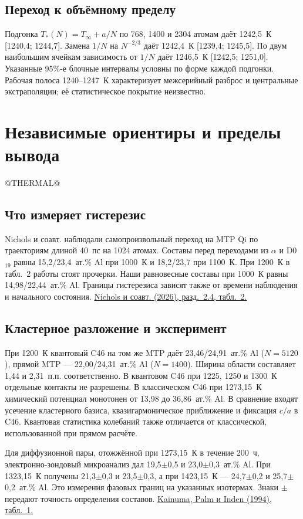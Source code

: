 \documentclass[11pt,a4paper]{article}
\begin{document}
\subsection*{Переход к объёмному пределу}
Подгонка \(T_*(N)=T_\infty+a/N\) по 768, 1400 и 2304 атомам даёт 1242,5~К [1240,4; 1244,7]. Замена \(1/N\) на \(N^{-2/3}\) даёт 1242,4~К [1239,4; 1245,5]. По двум наибольшим ячейкам зависимость от \(1/N\) даёт 1246,5~К [1242,5; 1251,0]. Указанные 95\%-е блочные интервалы условны по форме каждой подгонки. Рабочая полоса 1240--1247~К характеризует межсерийный разброс и центральные экстраполяции; её статистическое покрытие неизвестно.
\clearpage
\section*{Независимые ориентиры и пределы вывода}
@THERMAL@
\subsection*{Что измеряет гистерезис}
Nichols и соавт. наблюдали самопроизвольный переход на MTP Qi по траекториям длиной 40~пс на 1024 атомах. Составы перед переходами из \(\alpha\) и D0$_{19}$ равны 15,2/23,4~ат.\% Al при 1000~К и 18,2/23,7 при 1100~К. При 1200~К в табл.~2 работы стоят прочерки. Наши равновесные составы при 1000~К равны 14,98/22,44~ат.\% Al. Границы гистерезиса зависят также от времени наблюдения и начального состояния. \href{https://doi.org/10.3390/met16020140}{Nichols и соавт. (2026), разд.~2.4, табл.~2.}

\subsection*{Кластерное разложение и эксперимент}
При 1200~К квантовый C46 на том же MTP даёт 23,46/24,91~ат.\% Al (\(N=5120\)), прямой MTP --- 22,00/24,31~ат.\% Al (\(N=1400\)). Ширина области составляет 1,44 и 2,31~п.п. соответственно. В квантовом C46 при 1225, 1250 и 1300~К отдельные контакты не разрешены. В классическом C46 при 1273,15~К химический потенциал монотонен от 13,98 до 36,86~ат.\% Al. В сравнение входят усечение кластерного базиса, квазигармоническое приближение и фиксация \(c/a\) в C46. Квантовая статистика колебаний также отличается от классической, использованной при прямом расчёте.

Для диффузионной пары, отожжённой при 1273,15~К в течение 200~ч, электронно-зондовый микроанализ дал 19,5\(\pm\)0,5 и 23,0\(\pm\)0,3~ат.\% Al. При 1323,15~К получены 21,3\(\pm\)0,3 и 23,5\(\pm\)0,3, а при 1423,15~К --- 24,7\(\pm\)0,2 и 25,7\(\pm\)0,2~ат.\% Al. Это измерения фазовых границ на указанных изотермах. Знаки \(\pm\) передают точность определения составов. \href{https://doi.org/10.1016/0966-9795(94)90018-3}{Kainuma, Palm и Inden (1994), табл.~1.}
\end{document}
